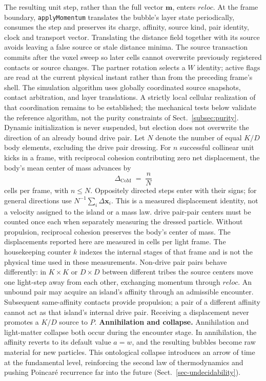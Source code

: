 \documentclass[a4paper]{article}
\begin{document}
The resulting unit step, rather than the full vector $\boldsymbol{m}$, enters $\boldsymbol{\mathit{reloc}}$. At the frame boundary, \texttt{applyMomentum} translates the bubble's layer state periodically, consumes the step and preserves its charge, affinity, source kind, pair identity, clock and transport vector. Translating the distance field together with its source avoids leaving a false source or stale distance minima. The source transaction commits after the voxel sweep so later cells cannot overwrite previously registered contacts or source changes. The partner rotation selects a $W$ identity; active flags are read at the current physical instant rather than from the preceding frame's shell.
The simulation algorithm uses globally coordinated source snapshots, contact arbitration, and layer translations. A strictly local cellular realization of that coordination remains to be established; the mechanical tests below validate the reference algorithm, not the purity constraints of Sect.~\ref{subsec:purity}. Dynamic initialization is never suspended, but election does not overwrite the direction of an already bound drive pair.
Let $N$ denote the number of equal $K/D$ body elements, excluding the drive pair dressing. For $n$ successful collinear unit kicks in a frame, with reciprocal cohesion contributing zero net displacement, the body's mean center of mass advances by
\begin{equation}
\Delta_{\mathrm{CoM}} \;=\; \frac{n}{N}
\end{equation}
cells per frame, with $n \leq N$. Oppositely directed steps enter with their signs; for general directions use $N^{-1}\sum_i\Delta\boldsymbol{x}_i$. This is a measured displacement identity, not a velocity assigned to the island or a mass law. drive pair-pair centers must be counted once each when separately measuring the dressed particle. Without propulsion, reciprocal cohesion preserves the body's center of mass. The displacements reported here are measured in cells per light frame. The housekeeping counter $k$ indexes the internal stages of that frame and is not the physical time used in these measurements.
Non-drive pair pairs behave differently: in $K \times K$ or $D \times D$ between different tribes the source centers move one light-step away from each other, exchanging momentum through $\boldsymbol{\mathit{reloc}}$.
An unbound pair may acquire an island's affinity through an admissible encounter. Subsequent same-affinity contacts provide propulsion; a pair of a different affinity cannot act as that island's internal drive pair. Receiving a displacement never promotes a $K/D$ source to $P$.
\medskip\noindent\textbf{Annihilation and collapse.} Annihilation and light-matter collapse both occur during the encounter stage. In annihilation, the affinity reverts to its default value $a=w$, and the resulting bubbles become raw material for new particles.
This ontological collapse introduces an arrow of time at the fundamental level, reinforcing the second law of thermodynamics and pushing Poincar\'{e} recurrence far into the future (Sect.~\ref{sec-undecidability}).
\end{document}
